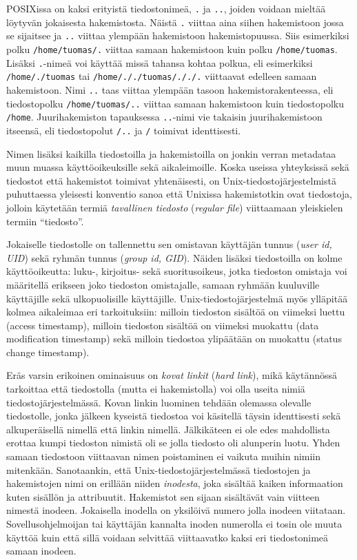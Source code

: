 POSIXissa on kaksi erityistä tiedostonimeä, \texttt{.} ja \texttt{..}, joiden voidaan mieltää löytyvän jokaisesta hakemistosta.
Näistä \texttt{.} viittaa aina siihen hakemistoon jossa se sijaitsee ja \texttt{..} viittaa ylempään hakemistoon hakemistopuussa.
Siis esimerkiksi polku \texttt{/home/tuomas/.} viittaa samaan hakemistoon kuin polku \texttt{/home/tuomas}.
Lisäksi \texttt{.}-nimeä voi käyttää missä tahansa kohtaa polkua,
eli esimerkiksi \texttt{/home/./tuomas} tai \texttt{/home/././tuomas/././.} viittaavat edelleen samaan hakemistoon.
Nimi \texttt{..} taas viittaa ylempään tasoon hakemistorakenteessa,
eli tiedostopolku \texttt{/home/tuomas/..} viittaa samaan hakemistoon kuin tiedostopolku \texttt{/home}.
Juurihakemiston tapauksessa \texttt{..}-nimi vie takaisin juurihakemistoon itseensä, eli tiedostopolut \texttt{/..} ja \texttt{/} toimivat identtisesti.

Nimen lisäksi kaikilla tiedostoilla ja hakemistoilla on jonkin verran metadataa muun muassa käyttöoikeuksille sekä aikaleimoille.
Koska useissa yhteyksissä sekä tiedostot että hakemistot toimivat yhtenäisesti,
on Unix-tiedostojärjestelmistä puhuttaessa yleisesti konventio sanoa että Unixissa hakemistotkin ovat tiedostoja,
jolloin käytetään termiä \emph{tavallinen tiedosto} (\emph{regular file}) viittaamaan yleiskielen termiin ``tiedosto''.

Jokaiselle tiedostolle on tallennettu sen omistavan käyttäjän tunnus (\emph{user id, UID}) sekä ryhmän tunnus (\emph{group id, GID}).
Näiden lisäksi tiedostoilla on kolme käyttöoikeutta: luku-, kirjoitus- sekä suoritusoikeus,
jotka tiedoston omistaja voi määritellä erikseen joko tiedoston omistajalle, samaan ryhmään kuuluville käyttäjille sekä ulkopuolisille käyttäjille.
Unix-tiedostojärjestelmä myös ylläpitää kolmea aikaleimaa eri tarkoituksiin:
milloin tiedoston sisältöä on viimeksi luettu (access timestamp), milloin tiedoston sisältöä on viimeksi muokattu (data modification timestamp) sekä milloin tiedostoa ylipäätään on muokattu (status change timestamp).

Eräs varsin erikoinen ominaisuus on \emph{kovat linkit} (\emph{hard link}), mikä käytännössä tarkoittaa että tiedostolla (mutta ei hakemistolla) voi olla useita nimiä tiedostojärjestelmässä.
Kovan linkin luominen tehdään olemassa olevalle tiedostolle,
jonka jälkeen kyseistä tiedostoa voi käsitellä täysin identtisesti sekä alkuperäisellä nimellä että linkin nimellä.
Jälkikäteen ei ole edes mahdollista erottaa kumpi tiedoston nimistä oli se jolla tiedosto oli alunperin luotu.
Yhden samaan tiedostoon viittaavan nimen poistaminen ei vaikuta muihin nimiin mitenkään.
Sanotaankin, että Unix-tiedostojärjestelmässä tiedostojen ja hakemistojen nimi on erillään niiden \emph{inodesta}, joka sisältää kaiken informaation kuten sisällön ja attribuutit.
Hakemistot sen sijaan sisältävät vain viitteen nimestä inodeen.
Jokaisella inodella on yksilöivä numero jolla inodeen viitataan.
Sovellusohjelmoijan tai käyttäjän kannalta inoden numerolla ei tosin ole muuta käyttöä kuin että sillä voidaan selvittää viittaavatko kaksi eri tiedostonimeä samaan inodeen.

